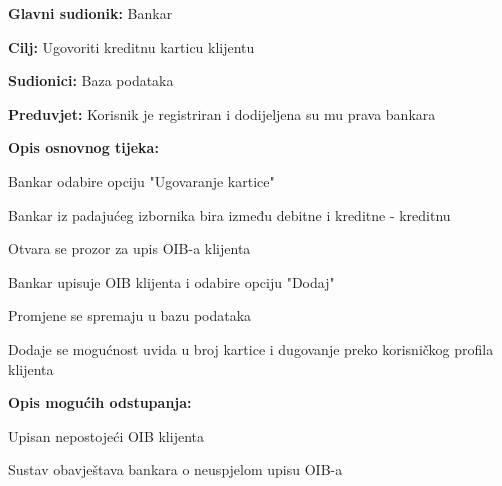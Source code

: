                 
                \noindent {}
                \begin{packed_item}
                
                  \item \textbf{Glavni sudionik: }Bankar
                  \item  \textbf{Cilj:} Ugovoriti kreditnu karticu klijentu
                  \item  \textbf{Sudionici:} Baza podataka
                  \item  \textbf{Preduvjet:} Korisnik je registriran i dodijeljena su mu prava bankara
                  \item  \textbf{Opis osnovnog tijeka:}
                  
                  \item[] \begin{packed_enum}
                
                    \item Bankar odabire opciju "Ugovaranje kartice"
                    \item Bankar iz padajućeg izbornika bira između debitne i kreditne - kreditnu
                    \item Otvara se prozor za upis OIB-a klijenta
                    \item Bankar upisuje OIB klijenta i odabire  opciju "Dodaj"
                    \item Promjene se spremaju u bazu podataka
                    \item Dodaje se mogućnost uvida u broj kartice i dugovanje preko korisničkog profila klijenta  
                  \end{packed_enum}
                  
                  \item  \textbf{Opis mogućih odstupanja:}
                  
                  \item[] \begin{packed_item}
                
                    \item[2.a] Upisan nepostojeći OIB klijenta
                    \item[] \begin{packed_enum}
                      
                      \item Sustav obavještava bankara o neuspjelom upisu OIB-a
                      
                    \end{packed_enum}
                    
                  \end{packed_item}
                \end{packed_item}
            
